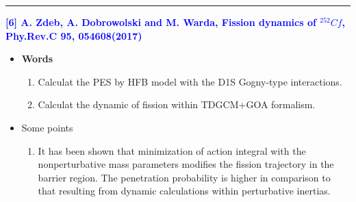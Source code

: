 \vspace{8pt}
\noindent\rule[0.25\baselineskip]{\textwidth}{2pt}
\noindent \textcolor{blue}{\textbf{[6] A. Zdeb, A. Dobrowolski and M. Warda, Fission dynamics of $^{252}Cf$, Phy.Rev.C 95, 054608(2017)}}
\begin{itemize}[leftmargin=10pt]
    \item  \textbf{Words}
    \begin{enumerate}[leftmargin=10pt]
        \item Calculat the PES by HFB model with the D1S Gogny-type interactions.
        \item Calculat the dynamic of fission within TDGCM+GOA formalism.
    \end{enumerate}
    \item Some points
    \begin{enumerate}[leftmargin=10pt]
        \item It has been shown that minimization of action integral with the nonperturbative mass parameters modifies the fission trajectory in the barrier region. The penetration probability is higher in comparison to that resulting from dynamic calculations within perturbative inertias.
    \end{enumerate}
\end{itemize}

